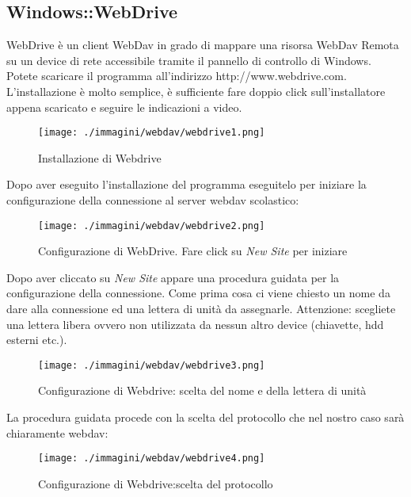 \subsection{Windows::WebDrive}


WebDrive è un client WebDav in grado di mappare una risorsa WebDav Remota su un device di rete accessibile tramite il pannello di controllo di Windows. Potete scaricare il programma all'indirizzo http://www.webdrive.com. L'installazione è molto semplice, è sufficiente fare doppio click sull'installatore appena scaricato e seguire le indicazioni a video.

\begin{figure}[H]
 \centering
 \texttt{[image: ./immagini/webdav/webdrive1.png]}
 \caption{Installazione di Webdrive}
 \label{fig:webdrive1}
\end{figure}

Dopo aver eseguito l'installazione del programma eseguitelo per iniziare la configurazione della connessione al server webdav scolastico:

\begin{figure}[H]
 \centering
 \texttt{[image: ./immagini/webdav/webdrive2.png]}
 \caption{Configurazione di WebDrive. Fare click su \textsl{New Site} per iniziare}
 \label{fig:webdrive2}
\end{figure}

Dopo aver cliccato su \textsl{New Site} appare una procedura guidata per la configurazione della connessione. Come prima cosa ci viene chiesto un nome da dare alla connessione ed una lettera di unità da assegnarle. Attenzione: scegliete una lettera libera ovvero non utilizzata da nessun altro device (chiavette, hdd esterni etc.).
\begin{figure}[H]
 \centering
 \texttt{[image: ./immagini/webdav/webdrive3.png]}
 \caption{Configurazione di Webdrive: scelta del nome e della lettera di unità}
 \label{fig:webdrive3}
\end{figure}
La procedura guidata procede con la scelta del protocollo che nel nostro caso sarà chiaramente webdav:

\begin{figure}[H]
 \centering
 \texttt{[image: ./immagini/webdav/webdrive4.png]}
 \caption{Configurazione di Webdrive:scelta del protocollo}
 \label{fig:webdrive4}
\end{figure}


